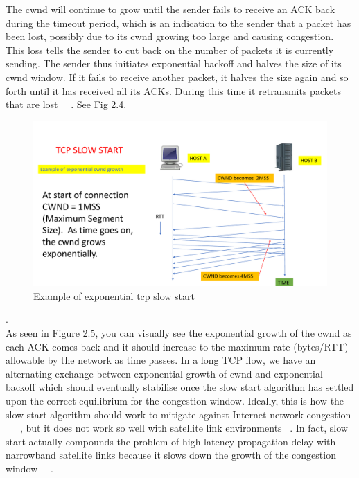The cwnd will continue to grow until the sender fails to receive an ACK back during the timeout period, which is an indication to the sender that a packet has been lost, possibly due to its cwnd growing too large and causing congestion. This loss tells the sender to cut back on the number of packets it is currently sending. The sender thus initiates exponential backoff and halves the size of its cwnd window. If it fails to receive another packet, it halves the size again and so forth until it has received all its ACKs. During this time it retransmits packets that are lost ~\cite{17}~\cite{18}.
See Fig 2.4.
\\
\begin{figure}[h]
    \centering
    \includegraphics[width=1.0\textwidth]{tcpSlowStart.pdf}
    \caption{Example of exponential tcp slow start}
    \label{cwnd}
\end{figure}.
\\

As seen in Figure 2.5, you can visually see the exponential growth of the cwnd as each ACK comes back and it should increase to the maximum rate (bytes/RTT) allowable by the network as time passes. In a long TCP flow, we have an alternating exchange between exponential growth of cwnd and exponential backoff which should eventually stabilise once the slow start algorithm has settled upon the correct equilibrium for the congestion window. Ideally, this is how the slow start algorithm should work to mitigate against Internet network congestion ~\cite{1}~\cite{17}~\cite{18}, but it does not work so well with satellite link environments ~\cite{14}. In fact, slow start actually compounds the problem of high latency propagation delay with narrowband satellite links because it slows down the growth of the congestion window ~\cite{13}~\cite{14}. \\

